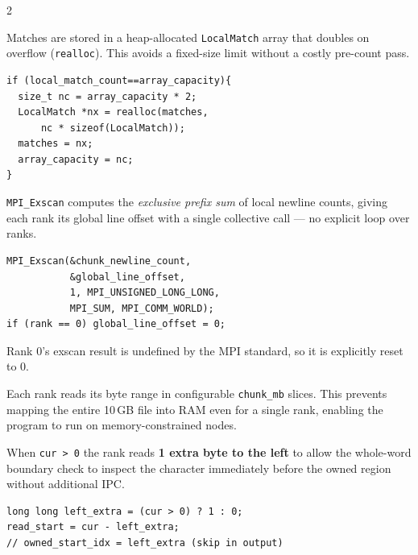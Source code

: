 \documentclass[11pt,a4paper]{article}
\begin{document}
\begin{multicols}{2}

\begin{tcolorbox}[trick={Trick 1 — Dynamic growing match array}]
Matches are stored in a heap-allocated \texttt{LocalMatch} array that doubles on overflow (\texttt{realloc}). This avoids a fixed-size limit without a costly pre-count pass.
\begin{lstlisting}[style=cstyle]
if (local_match_count==array_capacity){
  size_t nc = array_capacity * 2;
  LocalMatch *nx = realloc(matches,
      nc * sizeof(LocalMatch));
  matches = nx;
  array_capacity = nc;
}
\end{lstlisting}
\end{tcolorbox}

\vspace{0.3cm}

\begin{tcolorbox}[trick={Trick 2 — MPI\_Exscan for global line numbers}]
\texttt{MPI\_Exscan} computes the \emph{exclusive prefix sum} of local newline counts, giving each rank its global line offset with a single collective call — no explicit loop over ranks.
\begin{lstlisting}[style=cstyle]
MPI_Exscan(&chunk_newline_count,
           &global_line_offset,
           1, MPI_UNSIGNED_LONG_LONG,
           MPI_SUM, MPI_COMM_WORLD);
if (rank == 0) global_line_offset = 0;
\end{lstlisting}
Rank 0's exscan result is undefined by the MPI standard, so it is explicitly reset to 0.
\end{tcolorbox}

\columnbreak

\begin{tcolorbox}[trick={Trick 3 — Chunked I/O to control memory}]
Each rank reads its byte range in configurable \texttt{chunk\_mb} slices. This prevents mapping the entire 10\,GB file into RAM even for a single rank, enabling the program to run on memory-constrained nodes.
\end{tcolorbox}

\vspace{0.3cm}

\begin{tcolorbox}[trick={Trick 4 — Left-overlap read for boundary safety}]
When \texttt{cur > 0} the rank reads \textbf{1 extra byte to the left} to allow the whole-word boundary check to inspect the character immediately before the owned region without additional IPC.
\begin{lstlisting}[style=cstyle]
long long left_extra = (cur > 0) ? 1 : 0;
read_start = cur - left_extra;
// owned_start_idx = left_extra (skip in output)
\end{lstlisting}
\end{tcolorbox}


\end{multicols}
\end{document}
